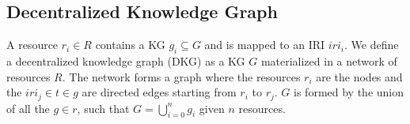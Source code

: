 \subsection{Decentralized Knowledge Graph}
A resource $r_i \in R$ contains a KG $g_i \subseteq G$ and is mapped to an IRI $iri_i$.
We define a decentralized knowledge graph (DKG) as a KG $G$ materialized in a network of resources $R$.
The network forms a graph where the resources $r_i$ are the nodes and the $iri_j \in t \in g$ are directed edges starting from $r_i$ to $r_j$.
$G$ is formed by the union of all the $g \in r$, such that $G = \bigcup_{i=0}^{n}g_i$ given $n$ resources.